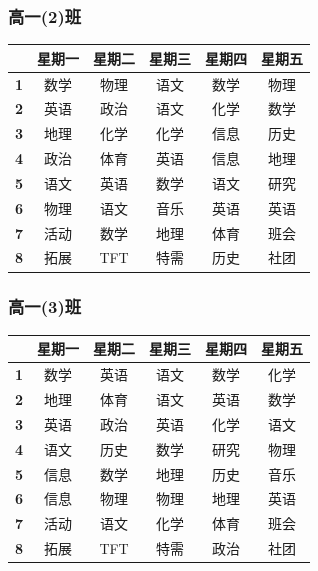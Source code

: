 \documentclass[a4paper]{article}
\begin{document}
  \subsubsection{高一(2)班}
   \begin{tabular}{|c|c|c|c|c|c|}
   \hline
   & \bf 星期一 & \bf 星期二 & \bf 星期三 & \bf 星期四 & \bf 星期五 \\\hline
   \bf 1 & 数学 & 物理 & 语文 & 数学 & 物理 \\\hline
   \bf 2 & 英语 & 政治 & 语文 & 化学 & 数学 \\\hline
   \bf 3 & 地理 & 化学 & 化学 & 信息 & 历史 \\\hline
   \bf 4 & 政治 & 体育 & 英语 & 信息 & 地理 \\\hline
   \bf 5 & 语文 & 英语 & 数学 & 语文 & 研究 \\\hline
   \bf 6 & 物理 & 语文 & 音乐 & 英语 & 英语 \\\hline
   \bf 7 & 活动 & 数学 & 地理 & 体育 & 班会 \\\hline
   \bf 8 & 拓展 & TFT  & 特需 & 历史 & 社团 \\\hline
   \end{tabular}
  \subsubsection{高一(3)班}
   \begin{tabular}{|c|c|c|c|c|c|}
   \hline
   & \bf 星期一 & \bf 星期二 & \bf 星期三 & \bf 星期四 & \bf 星期五 \\\hline
   \bf 1 & 数学 & 英语 & 语文 & 数学 & 化学 \\\hline
   \bf 2 & 地理 & 体育 & 语文 & 英语 & 数学 \\\hline
   \bf 3 & 英语 & 政治 & 英语 & 化学 & 语文 \\\hline
   \bf 4 & 语文 & 历史 & 数学 & 研究 & 物理 \\\hline
   \bf 5 & 信息 & 数学 & 地理 & 历史 & 音乐 \\\hline
   \bf 6 & 信息 & 物理 & 物理 & 地理 & 英语 \\\hline
   \bf 7 & 活动 & 语文 & 化学 & 体育 & 班会 \\\hline
   \bf 8 & 拓展 & TFT  & 特需 & 政治 & 社团 \\\hline
   \end{tabular}
\end{document}
